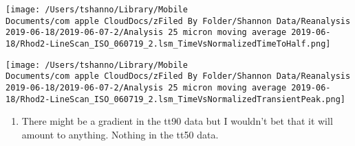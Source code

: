 \documentclass[11pt]{article}
\begin{document}
\begin{enumerate}
\begin{enumerate}
\begin{enumerate}
\begin{center}
\texttt{[image: /Users/tshanno/Library/Mobile Documents/com~apple~CloudDocs/zFiled By Folder/Shannon Data/Reanalysis 2019-06-18/2019-06-07-2/Analysis 25 micron moving average 2019-06-18/Rhod2-LineScan\_ISO\_060719\_2.lsm\_TimeVsNormalizedTimeToHalf.png]}
\end{center}

\begin{center}
\texttt{[image: /Users/tshanno/Library/Mobile Documents/com~apple~CloudDocs/zFiled By Folder/Shannon Data/Reanalysis 2019-06-18/2019-06-07-2/Analysis 25 micron moving average 2019-06-18/Rhod2-LineScan\_ISO\_060719\_2.lsm\_TimeVsNormalizedTransientPeak.png]}
\end{center}
\begin{enumerate}
\item There might be a gradient in the tt90 data but I wouldn't bet that it will amount to anything.   Nothing in the tt50 data.
\label{sec:orgac45daa}


\end{enumerate}
\end{enumerate}
\end{enumerate}
\end{enumerate}
\end{document}
